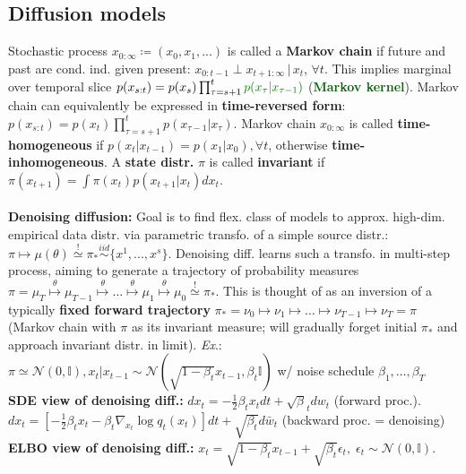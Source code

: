 \subsection{Diffusion models}
Stochastic process $x_{0:\infty} \coloneqq (x_0,x_1,...)$ is called a \textbf{Markov chain} if future and past are cond. ind. given present: ${x_{0:t-1}}\perp{x_{t+1:\infty}} \,|\, x_t$, $\forall t$. This implies marginal over temporal slice $p(x_{s:t})=p(x_s)\prod_{\tau=s+1}^t \textcolor{darkgreen}{p(x_\tau|x_{\tau-1})}$ (\textcolor{darkgreen}{\textbf{Markov kernel}}). 
Markov chain can equivalently be expressed in \textbf{time-reversed form}: $p(x_{s:t})=p(x_t)\prod_{\tau = s+1}^t p(x_{\tau-1}|x_\tau)$. Markov chain $x_{0:\infty}$ is called \textbf{time-homogeneous} if $p(x_t|x_{t-1})=p(x_1|x_0), \forall t$, otherwise \textbf{time-inhomogeneous}. A \textbf{state distr.} $\pi$ is called \textbf{invariant} if $\pi(x_{t+1})=\int \pi(x_t)p(x_{t+1}|x_t)dx_t$. \\
\vspace{0.01cm}\dotfill\vspace{0.01cm}\\
\textbf{Denoising diffusion:} Goal is to find flex. class of models to approx. high-dim. empirical data distr. via parametric transfo. of a simple source distr.: $\pi \mapsto \mu(\theta) \overset{!}\simeq \pi_* \overset{iid}{\sim}\{x^1,...,x^s\}$. Denoising diff. learns such a transfo. in multi-step process, aiming to generate a trajectory of probability measures $\pi=\mu_T \overset{\theta}\mapsto \mu_{T-1} \overset{\theta}{\mapsto}  \dots \overset{\theta}{\mapsto}\mu_1\overset{\theta}{\mapsto}\mu_0\overset{!}{\simeq}\pi_*$. This is thought of as an inversion of a typically \textbf{fixed forward trajectory} $\pi_*=\nu_0 \mapsto \nu_{1} \mapsto \dots \mapsto\nu_{T-1}\mapsto\nu_T=\pi$ (Markov chain with $\pi$ as its invariant measure; will gradually forget initial $\pi_*$ and approach invariant distr. in limit). \emph{Ex}.: $\pi \simeq \mathcal{N}(0, \mathbb{I}), x_t|x_{t-1} \sim \mathcal{N}(\sqrt{1-\beta_t}x_{t-1}, \beta_t\mathbb{I})$ w/ noise schedule $\beta_1,\dots,\beta_T$\\
\textbf{SDE view of denoising diff.:} $dx_t=-\frac{1}{2}\beta_tx_tdt+\sqrt\beta_tdw_t$ (forward proc.). \\
$dx_t=[-\frac{1}{2}\beta_tx_t-\beta_t\nabla_{x_t}\log q_t(x_t)]dt+\sqrt{\beta_t}d\bar{w}_t$ (backward proc. = denoising)
\textbf{ELBO view of denoising diff.:} $x_t=\sqrt{1-\beta_t}x_{t-1}+\sqrt{\beta_t}\epsilon_t, \; \epsilon_t\sim\mathcal{N}(0,\mathbb{I})$. \\
